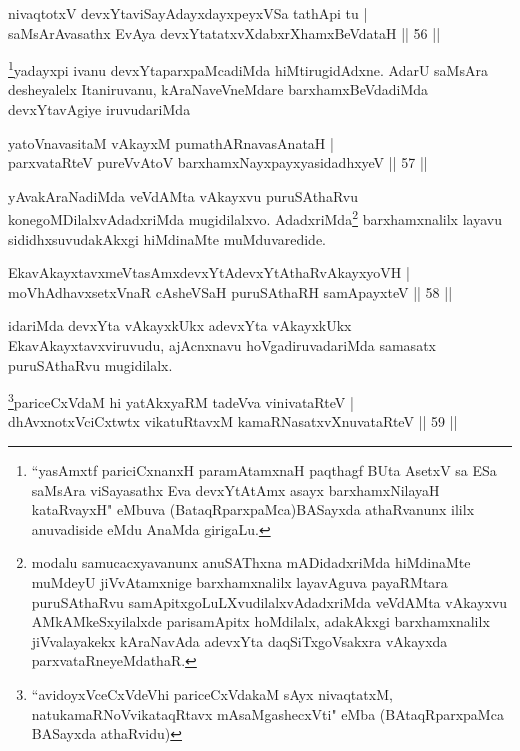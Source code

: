 \begin{shl}
nivaqtotxV devxYtaviSayAdayxdayxpeyxVSa tathA\s pi tu |\\
saMsArAvasathx EvAya devxYtatatxvXdabxrXhamxBeVdataH \hfill || 56 ||
\end{shl}

\begin{artha}
\footnote{``yasAmxtf pariciCxnanxH paramAtamxnaH paqthagf BUta AsetxV sa ESa saMsAra viSayasathx Eva devxYtAtAmx asayx barxhamxNilayaH kataRvayxH" eMbuva (BataqRparxpaMca)BASayxda athaRvanunx ililx anuvadiside eMdu AnaMda girigaLu.}yadayxpi ivanu devxYtaparxpaMcadiMda hiMtirugidAdxne. AdarU saMsAra desheyalelx Itaniruvanu, kAraNaveVneMdare barxhamxBeVdadiMda devxYtavAgiye iruvudariMda
\end{artha}

\begin{shl}
yatoV\s navasitaM vAkayxM pumathARnavasAnataH |\\
parxvataRteV pureVvAtoV barxhamxNayxpayxyasidadhxyeV \hfill || 57 ||
\end{shl}

\begin{artha}
yAvakAraNadiMda veVdAMta vAkayxvu puruSAthaRvu kone\-goMDilalxvAdadxriMda mugidilalxvo. AdadxriMda\footnote{modalu samucacxyavanunx anuSAThxna mADidadxriMda hiMdinaMte muMdeyU jiVvAtamxnige barxhamxnalilx layavAguva payaRMtara puruSAthaRvu samApitxgoLuLXvudilalxvAdadxriMda veVdAMta vAkayxvu AMkAMkeSxyilalxde parisamApitx hoMdilalx, adakAkxgi barxhamxnalilx jiVvalayakekx kAraNavAda adevxYta daqSiTxgoVsakxra vAkayxda parxvataRneyeMdathaR.} barxhamxnalilx layavu sididhxsuvudakAkxgi hiMdinaMte muMduvaredide.
\end{artha}

\begin{shl}
EkavAkayxtavxmeVtasAmxdevxYtAdevxYtAthaRvAkayxyoVH |\\
moVhAdhavxsetxVnaR cAsheVSaH puruSAthaRH samApayxteV \hfill || 58 ||
\end{shl}

\begin{artha}
idariMda devxYta vAkayxkUkx adevxYta vAkayxkUkx EkavAkayxtavxviruvudu, ajAcnxnavu hoVgadiruvadariMda samasatx puruSAthaRvu mugidilalx.
\end{artha}

\begin{shl}
\footnote{``avidoyxVceCxVdeVhi pariceCxVdakaM sAyx nivaqtatxM, natukamaRNoVvikataqRtavx mAsaMgashecxVti" eMba (BAtaqRparxpaMca BASayxda athaRvidu)}pariceCxVdaM hi yatAkxyaRM tadeVva vinivataRteV |\\
dhAvxnotxVciCxtwtx vikatuRtavxM kamaRNasatxvXnuvataRteV \hfill || 59 ||
\end{shl}

